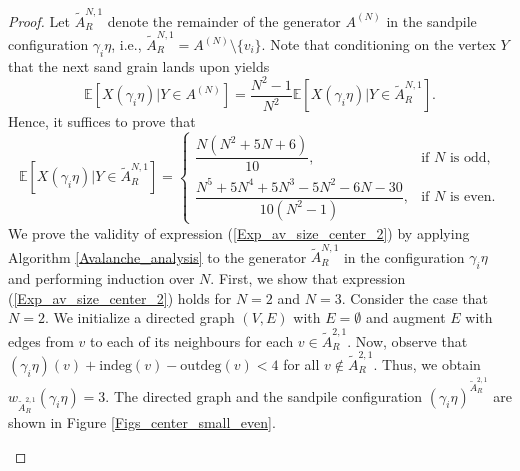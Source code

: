 \documentclass{article}
\begin{document}
\begin{proof}
    Let $\tilde{A}_R^{N,1}$ denote the remainder of the generator $A^{(N)}$ in the sandpile configuration $\gamma_i \eta$, i.e., $\tilde{A}_R^{N,1} = A^{(N)} \setminus \{v_i\}$. Note that conditioning on the vertex $Y$ that the next sand grain lands upon yields
    \begin{equation*}
        \mathbb{E}[X(\gamma_i \eta)|Y \in A^{(N)}] = \dfrac{N^2-1}{N^2} \mathbb{E}[X(\gamma_i \eta)|Y \in \tilde{A}^{N,1}_R].
    \end{equation*}
    Hence, it suffices to prove that
    \begin{equation}\label{Exp_av_size_center_2}
\mathbb{E}[X(\gamma_i \eta)|Y \in \tilde{A}^{N,1}_R] = \begin{cases}
    \dfrac{N(N^2+5N+6)}{10}, &\text{if } N \text{ is odd}, \\[1.2em]
    \dfrac{N^5+5N^4+5N^3-5N^2-6N-30}{10(N^2-1)}, &\text{if } N \text{ is even.}
    \end{cases}
\end{equation}
    We prove the validity of expression (\ref{Exp_av_size_center_2}) by applying Algorithm \ref{Avalanche_analysis} to the generator $\tilde{A}^{N,1}_R$ in the configuration $\gamma_i \eta$ and performing induction over $N$. First, we show that expression (\ref{Exp_av_size_center_2}) holds for $N = 2$ and $N = 3$. Consider the case that $N = 2$. We initialize a directed graph $(V, E)$ with $E = \emptyset$ and augment $E$ with edges from $v$ to each of its neighbours for each $v \in \tilde{A}^{2,1}_R$. Now, observe that $(\gamma_i \eta)(v) + \text{indeg}(v) - \text{outdeg}(v) < 4$ for all $v \notin \tilde{A}_R^{2, 1}$. Thus, we obtain $w_{\tilde{A}_R^{2,1}}(\gamma_i \eta) = 3$. The directed graph and the sandpile configuration $(\gamma_i \eta)^{\tilde{A}_R^{2,1}}$ are shown in Figure \ref{Figs_center_small_even}. 

   \begin{figure}[H]
    \centering
    \captionsetup[subfigure]{justification=centering, labelformat=empty, singlelinecheck=false, width=0.6\linewidth}


\end{figure}
\end{proof}
\end{document}
